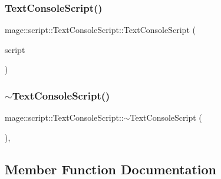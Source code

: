 \hypertarget{classmage_1_1script_1_1_text_console_script_a46052af67069fef12a8ff9de75cce382}{}\label{classmage_1_1script_1_1_text_console_script_a46052af67069fef12a8ff9de75cce382} 
\subsubsection{\texorpdfstring{Text\+Console\+Script()}{TextConsoleScript()}\hspace{0.1cm}{\footnotesize\ttfamily [3/3]}}
{\footnotesize\ttfamily mage\+::script\+::\+Text\+Console\+Script\+::\+Text\+Console\+Script (\begin{DoxyParamCaption}\item[{\hyperlink{classmage_1_1script_1_1_text_console_script}{Text\+Console\+Script} \&\&}]{script }\end{DoxyParamCaption})\hspace{0.3cm}{\ttfamily [noexcept]}}

\hypertarget{classmage_1_1script_1_1_text_console_script_af0959c8a4f21bb4f9b5553dffc5710b9}{}\label{classmage_1_1script_1_1_text_console_script_af0959c8a4f21bb4f9b5553dffc5710b9} 
\subsubsection{\texorpdfstring{$\sim$\+Text\+Console\+Script()}{~TextConsoleScript()}}
{\footnotesize\ttfamily mage\+::script\+::\+Text\+Console\+Script\+::$\sim$\+Text\+Console\+Script (\begin{DoxyParamCaption}{ }\end{DoxyParamCaption})\hspace{0.3cm}{\ttfamily [virtual]}, {\ttfamily [default]}}



\subsection{Member Function Documentation}
\hypertarget{classmage_1_1script_1_1_text_console_script_a274764deea9f02ec77515680456548d6}{}\label{classmage_1_1script_1_1_text_console_script_a274764deea9f02ec77515680456548d6} 
